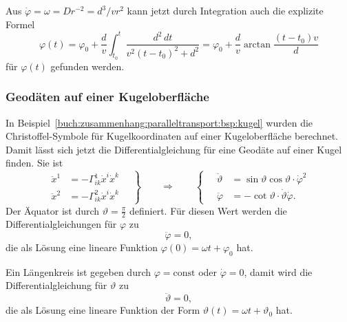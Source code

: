 Aus $\dot{\varphi}=\omega = Dr^{-2} = d^3 / v r^2$
kann jetzt durch Integration auch die explizite Formel 
\[
\varphi(t)
=
\varphi_0
+
\frac{d}{v}
\int_{t_0}^t
\frac{d^2\,dt}{v^2(t-t_0)^2+d^2}
=
\varphi_0
+
\frac{d}{v}
\arctan\frac{(t-t_0)v}{d}
\]
für $\varphi(t)$ gefunden werden.

\subsubsection{Geodäten auf einer Kugeloberfläche}
In Beispiel~\ref{buch:zusammenhang:paralleltransport:bsp:kugel}
wurden die Christoffel-Symbole für Kugelkoordinaten auf einer
Kugeloberfläche berechnet.
%
Damit lässt sich jetzt die Differentialgleichung für eine Geodäte auf
einer Kugel finden.
Sie ist
\begin{equation}
\left.
\begin{aligned}
\ddot{x}^1 &= -\Gamma^1_{ik}\dot{x}^i\dot{x}^k
\\
\ddot{x}^2 &= -\Gamma^2_{ik}\dot{x}^i\dot{x}^k
\end{aligned}
\quad
\right\}
\qquad\Rightarrow\qquad
\left\{
\quad
\begin{aligned}
\ddot{\vartheta}
&=
\sin\vartheta\cos\vartheta \cdot \dot{\varphi}^2
\\
\ddot{\varphi}
&=
-\cot\vartheta \cdot \dot{\vartheta}\dot{\varphi}.
\end{aligned}
\right.
\label{buch:zusammenhang:geodaeten:kugeldgl}
\end{equation}
Der Äquator ist durch $\vartheta=\frac{\pi}2$ definiert.
Für diesen Wert werden die Differentialgleichungen für $\varphi$ zu
\[
\ddot{\varphi}=0,
\]
die als Lösung eine lineare Funktion
$\varphi(0)=\omega t +\varphi_0$ hat.

Ein Längenkreis ist gegeben durch $\varphi=\text{const}$ oder
$\dot{\varphi}=0$, damit wird die Differentialgleichung für $\vartheta$
zu
\[
\ddot{\vartheta} = 0,
\]
die als Lösung eine lineare Funktion der Form
$\vartheta(t) = \omega t + \vartheta_0$ hat.

